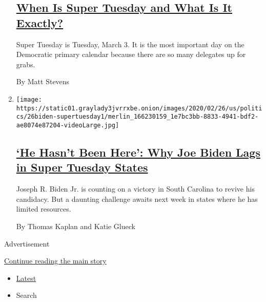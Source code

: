\begin{enumerate}
{  \subsection{\texorpdfstring{\href{/2020/02/27/us/politics/super-tuesday.html}{When
  Is Super Tuesday and What Is It
  Exactly?}}{When Is Super Tuesday and What Is It Exactly?}}\label{when-is-super-tuesday-and-what-is-it-exactly}}

  Super Tuesday is Tuesday, March 3. It is the most important day on the
  Democratic primary calendar because there are so many delegates up for
  grabs.

  By Matt Stevens
\item
  \texttt{[image: https://static01.graylady3jvrrxbe.onion/images/2020/02/26/us/politics/26biden-supertuesday1/merlin\_166230159\_1e7bc3bb-8833-4941-bdf2-ae8074e87204-videoLarge.jpg]}

  \hypertarget{he-hasnt-been-here-why-joe-biden-lags-in-super-tuesday-states}{%
  \subsection{\texorpdfstring{\href{/2020/02/26/us/politics/joe-biden-california-super-tuesday.html}{`He
  Hasn't Been Here': Why Joe Biden Lags in Super Tuesday
  States}}{`He Hasn't Been Here': Why Joe Biden Lags in Super Tuesday States}}\label{he-hasnt-been-here-why-joe-biden-lags-in-super-tuesday-states}}

  Joseph R. Biden Jr. is counting on a victory in South Carolina to
  revive his candidacy. But a daunting challenge awaits next week in
  states where he has limited resources.

  By Thomas Kaplan and Katie Glueck
\end{enumerate}

Advertisement

\protect\hyperlink{after-mid1}{Continue reading the main story}

\begin{itemize}
\tightlist
\item
  \protect\hyperlink{stream-panel}{Latest}
\item
  Search
\end{itemize}

